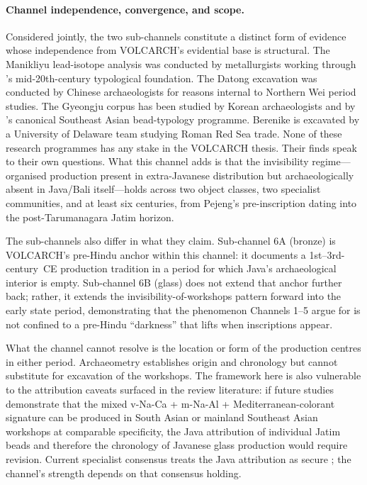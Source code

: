 \documentclass[12pt,a4paper]{article}
\begin{document}
\paragraph{Channel independence, convergence, and scope.} Considered jointly, the two sub-channels constitute a distinct form of evidence whose independence from VOLCARCH's evidential base is structural. The Manikliyu lead-isotope analysis was conducted by metallurgists working through \citeauthor{bernetkempers1988}'s mid-20th-century typological foundation. The Datong excavation was conducted by Chinese archaeologists for reasons internal to Northern Wei period studies. The Gyeongju corpus has been studied by Korean archaeologists and by \citeauthor{lankton2008}'s canonical Southeast Asian bead-typology programme. Berenike is excavated by a University of Delaware team studying Roman Red Sea trade. None of these research programmes has any stake in the VOLCARCH thesis. Their finds speak to their own questions. What this channel adds is that the invisibility regime---organised production present in extra-Javanese distribution but archaeologically absent in Java/Bali itself---holds across two object classes, two specialist communities, and at least six centuries, from Pejeng's pre-inscription dating into the post-Tarumanagara Jatim horizon.

The sub-channels also differ in what they claim. Sub-channel 6A (bronze) is VOLCARCH's pre-Hindu anchor within this channel: it documents a 1st--3rd-century~CE production tradition in a period for which Java's archaeological interior is empty. Sub-channel 6B (glass) does not extend that anchor further back; rather, it extends the invisibility-of-workshops pattern forward into the early state period, demonstrating that the phenomenon Channels 1--5 argue for is not confined to a pre-Hindu ``darkness'' that lifts when inscriptions appear.

What the channel cannot resolve is the location or form of the production centres in either period. Archaeometry establishes origin and chronology but cannot substitute for excavation of the workshops. The framework here is also vulnerable to the attribution caveats surfaced in the review literature: if future studies demonstrate that the mixed v-Na-Ca + m-Na-Al + Mediterranean-colorant signature can be produced in South Asian or mainland Southeast Asian workshops at comparable specificity, the Java attribution of individual Jatim beads and therefore the chronology of Javanese glass production would require revision. Current specialist consensus treats the Java attribution as secure \citep{lankton2008,jia_etal_2024}; the channel's strength depends on that consensus holding.
\end{document}
